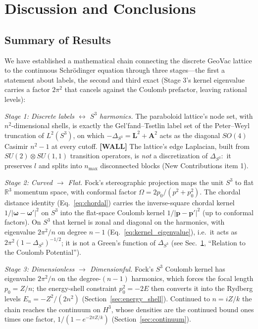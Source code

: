 \documentclass[aps,pra,twocolumn,superscriptaddress,longbibliography]{revtex4-2}
\newcommand{\gvc}[2]{#2}
\begin{document}
\section{Discussion and Conclusions}
\label{sec:discussion}

\subsection{Summary of Results}

We have established a mathematical chain connecting the discrete GeoVac lattice to the continuous Schr\"odinger equation through three stages---the first a statement about labels, the second and third exact (Stage 3's kernel eigenvalue carries a factor $2\pi^2$ that cancels against the Coulomb prefactor, leaving rational levels):

\textit{Stage 1: Discrete labels $\leftrightarrow$ $S^3$ harmonics.} The paraboloid lattice's node set, with $n^2$-dimensional shells, is exactly the Gel'fand--Tsetlin label set of the Peter--Weyl truncation of $L^2(S^3)$, on which $-\Delta_{S^3} = \mathbf{L}^2 + \mathbf{A}^2$ acts as the diagonal $SO(4)$ Casimir $n^2 - 1$ at every cutoff. \textbf{[WALL]} \gvc{graph-s3-wall}{The lattice's edge Laplacian, built from $SU(2) \otimes SU(1,1)$ transition operators, is \emph{not} a discretization of $\Delta_{S^3}$:\ it preserves $l$ and splits into $n_{\max}$ disconnected blocks (New Contributions item 1)}.

\textit{Stage 2: Curved $\to$ Flat.} Fock's stereographic projection maps the unit $S^3$ to flat $\mathbb{R}^3$ momentum space, with conformal factor $\Omega = 2p_0/(p^2 + p_0^2)$. The chordal distance identity (Eq.~\ref{eq:chordal}) carries the inverse-square chordal kernel $1/|\boldsymbol{\omega}-\boldsymbol{\omega}'|^2$ on $S^3$ into the flat-space Coulomb kernel $1/|\mathbf{p}-\mathbf{p}'|^2$ (up to conformal factors). On $S^3$ that kernel is zonal and diagonal on the harmonics, with eigenvalue $2\pi^2/n$ on degree $n-1$ (Eq.~\ref{eq:kernel_eigenvalue}), i.e.\ it acts as $2\pi^2(1-\Delta_{S^3})^{-1/2}$; it is not a Green's function of $\Delta_{S^3}$ (see Sec.~\ref{sec:discussion}, ``Relation to the Coulomb Potential'').

\textit{Stage 3: Dimensionless $\to$ Dimensionful.} Fock's $S^3$ Coulomb kernel has eigenvalue $2\pi^2/n$ on the degree-$(n-1)$ harmonics, which forces the focal length $p_0 = Z/n$; the energy-shell constraint $p_0^2 = -2E$ then converts it into the Rydberg levels $E_n = -Z^2/(2n^2)$ (Section~\ref{sec:energy_shell}). Continued to $n = iZ/k$ the chain reaches the continuum on $H^3$, whose densities are the continued bound ones times one factor, $1/(1-e^{-2\pi Z/k})$ (Section~\ref{sec:continuum}).
\end{document}
